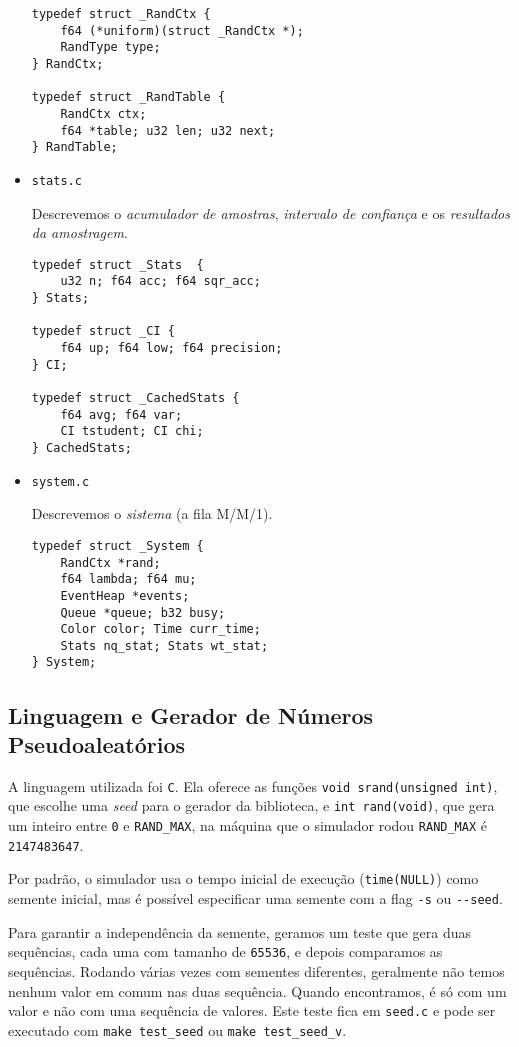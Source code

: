 \documentclass[a4paper]{article}
\newcommand{\arq}{\texttt}
\newcommand{\inlcode}{\texttt}
\newcommand{\lang}{\texttt}
\begin{document}
\begin{itemize}
\begin{verbatim}
typedef struct _RandCtx {
    f64 (*uniform)(struct _RandCtx *);
    RandType type;
} RandCtx;

typedef struct _RandTable {
    RandCtx ctx;
    f64 *table; u32 len; u32 next;
} RandTable;
        \end{verbatim}
    \item \arq{stats.c} \par
        Descrevemos o \emph{acumulador de amostras},
        \emph{intervalo de confiança} e
        os \emph{resultados da amostragem}.
        \begin{verbatim}
typedef struct _Stats  {
    u32 n; f64 acc; f64 sqr_acc;
} Stats;

typedef struct _CI {
    f64 up; f64 low; f64 precision;
} CI;

typedef struct _CachedStats {
    f64 avg; f64 var;
    CI tstudent; CI chi;
} CachedStats;
        \end{verbatim}
    \item \arq{system.c} \par
        Descrevemos o \emph{sistema} (a fila M/M/1).
        \begin{verbatim}
typedef struct _System {
    RandCtx *rand;
    f64 lambda; f64 mu;
    EventHeap *events;
    Queue *queue; b32 busy;
    Color color; Time curr_time;
    Stats nq_stat; Stats wt_stat;
} System;
        \end{verbatim}
\end{itemize}

\subsection{Linguagem e Gerador de Números Pseudoaleatórios}
A linguagem utilizada foi \lang{C}.
Ela oferece as funções \inlcode{void srand(unsigned int)},
que escolhe uma \emph{seed} para o gerador da biblioteca,
e \inlcode{int rand(void)}, que gera um inteiro entre
\inlcode{0} e \inlcode{RAND\_MAX},
na máquina que o simulador rodou
\inlcode{RAND\_MAX} é \inlcode{2147483647}.

Por padrão, o simulador usa
o tempo inicial de execução (\inlcode{time(NULL)})
como semente inicial,
mas é possível especificar uma semente com a flag
\inlcode{-s} ou \inlcode{-{}-seed}.

Para garantir a independência da semente,
geramos um teste que gera duas sequências,
cada uma com tamanho de \inlcode{65536},
e depois comparamos as sequências.
Rodando várias vezes com sementes diferentes,
geralmente não temos nenhum valor em comum
nas duas sequência.
Quando encontramos, é só com um valor
e não com uma sequência de valores.
Este teste fica em \arq{seed.c} e
pode ser executado com
\inlcode{make test\_seed} ou
\inlcode{make test\_seed\_v}.
\end{document}
